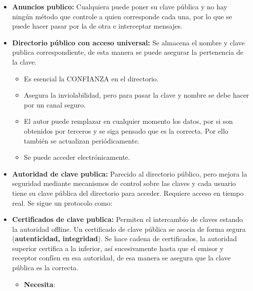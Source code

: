 \documentclass[12pt, twoside, openright]{report} %
\begin{document}
\begin{itemize}
    \begin{itemize}
    \item \textbf{Anuncios publico:} Cualquiera puede poner su clave pública
      y no hay ningún método que controle a quien corresponde cada una,
      por lo que se puede hacer pasar por la de otra e interceptar
      mensajes.
      
    \item \textbf{Directorio público con acceso universal:} Se almacena el
      nombre y clave publica correspondiente, de esta manera se puede
      asegurar la pertenencia de la clave.
      

      \begin{itemize}
      \item Es esencial la CONFIANZA en el directorio.
        
      \item Asegura la inviolabilidad, pero para pasar la clave y nombre se
        debe hacer por un canal seguro.
        
      \item El autor puede remplazar en cualquier momento los datos, por si
        son obtenidos por terceros y se siga pensado que es la correcta.
        Por ello también se actualizan periódicamente.
        
      \item Se puede acceder electrónicamente.
        
      \end{itemize}
    \item \textbf{Autoridad de clave publica:} Parecido al directorio
      público, pero mejora la seguridad mediante mecanismos de control
      sobre las claves y cada usuario tiene su clave pública del
      directorio para acceder. Requiere acceso en tiempo real. Se sigue
      un protocolo como:
      
    \item \textbf{Certificados de clave publica:} Permiten el intercambio de
      claves estando la autoridad offline. Un certificado de clave
      pública se asocia de forma segura (\textbf{autenticidad,
      integridad}). Se hace cadena de certificados, la autoridad
      superior certifica a la inferior, así sucesivamente hasta que el
      emisor y receptor confíen en esa autoridad, de esa manera se
      asegura que la clave pública es la correcta.
      

      \begin{itemize}
      \item \textbf{Necesita}:
        


\end{itemize}
\end{itemize}
\end{itemize}
\end{document}
